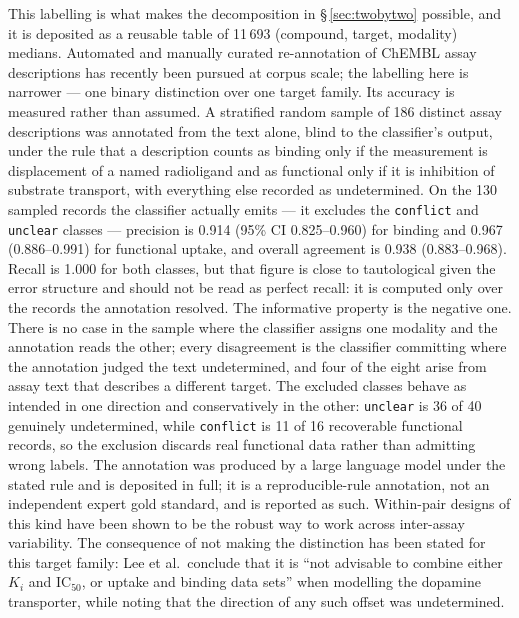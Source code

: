 \documentclass[11pt,a4paper]{article}
\begin{document}
This labelling is what makes the decomposition in \S\,\ref{sec:twobytwo} possible, and
it is deposited as a reusable table of 11\,693 (compound, target, modality) medians.
Automated and manually curated re-annotation of ChEMBL assay descriptions has recently
been pursued at corpus scale;\cite{Smit2026} the labelling here is narrower --- one
binary distinction over one target family. Its accuracy is measured rather than assumed.
A stratified random sample of 186 distinct assay descriptions was annotated from the text
alone, blind to the classifier's output, under the rule that a description counts as
binding only if the measurement is displacement of a named radioligand and as functional
only if it is inhibition of substrate transport, with everything else recorded as
undetermined. On the 130 sampled records the classifier actually emits --- it excludes the
\texttt{conflict} and \texttt{unclear} classes --- precision is 0.914 (95\% CI
0.825--0.960) for binding and 0.967 (0.886--0.991) for functional uptake, and overall agreement is 0.938
(0.883--0.968). Recall is 1.000 for both classes, but that figure is close to tautological
given the error structure and should not be read as perfect recall: it is computed only
over the records the annotation resolved. The informative property is the negative one. There is no case in the sample where the classifier assigns one modality
and the annotation reads the other; every disagreement is the classifier committing where the
annotation judged the text undetermined, and four of the eight arise from assay text that
describes a different target. The excluded classes behave as intended in one direction and
conservatively in the other: \texttt{unclear} is 36 of 40 genuinely undetermined, while
\texttt{conflict} is 11 of 16 recoverable functional records, so the exclusion discards
real functional data rather than admitting wrong labels. The annotation was produced by a
large language model under the stated rule and is deposited in full; it is a
reproducible-rule annotation, not an independent expert gold standard, and is reported as
such. Within-pair designs of this kind have been shown to be the robust way
to work across inter-assay variability.\cite{Nelen2025} The consequence of not
making the distinction has been stated for this target family: Lee et al.\ conclude
that it is ``not advisable to combine either $K_i$ and IC$_{50}$, or uptake and
binding data sets'' when modelling the dopamine transporter, while noting that the
direction of any such offset was undetermined.\cite{Lee2024}
\end{document}
